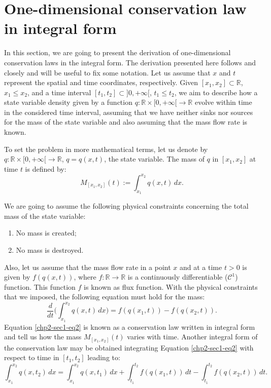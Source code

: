 \section{One-dimensional conservation law in integral form}
\label{chp2-sec1}
In this section, we are going to present the derivation of one-dimensional 
conservation laws in the integral form. 
The derivation presented here follows \citet{leveque:1990} and \citet{leveque:2002} closely and will
be useful to fix some notation. 
Let us assume that $x$ and $t$ represent the spatial and time coordinates, respectively.
Given $[x_1, x_2] \subset \mathbb{R}$, $x_1 \leq x_2$, and a time 
interval $[t_1, t_2] \subset ]0, +\infty[$, $t_1 \leq t_2$, 
we aim to describe how a state variable density given by a function
$q: \mathbb{R}\times[0, +\infty[ \to \mathbb{R}$ 
evolve within time in the considered time interval, assuming that we have neither sinks nor sources 
for the mass of the state variable and also assuming that the mass
flow rate is known.

To set the problem in more mathematical terms, let us denote by 
${q}: \mathbb{R}\times [0, +\infty[\to \mathbb{R}$, 
${q} = {q}(x,t)$, the state variable.
The mass of ${q}$ in $[x_1, x_2]$ at time $t$ is defined by:
\begin{equation}
	\label{chp2-sec1-eq1}
	{M}_{[x_1, x_2]}(t) := \int_{x_1}^{x_2} {q}(x,t) \,dx.
\end{equation}

We are going to assume the following physical constraints concerning the total mass of the state variable:
\begin{enumerate}
	\item No mass is created;
	\item No mass is destroyed.
\end{enumerate}

Also, let us assume that the mass flow rate in a point $x$ and at a time 
$t > 0$ is given by ${f}({q}(x,t))$, where ${f}:\mathbb{R} \to \mathbb{R}$ is 
a continuously differentiable ($\mathcal{C}^1$) function. This function ${f}$ is known as flux function.
With the physical constraints that we imposed, the following equation must hold for the mass:
\begin{equation}
	\label{chp2-sec1-eq2}
	\frac{d}{dt} \bigg( \int_{x_1}^{x_2} {q}(x,t) \,dx \bigg) = 
	{f}({q}(x_1,t)) - {f}({q}(x_2,t)) .
\end{equation}
Equation \eqref{chp2-sec1-eq2} is known as a conservation law written in integral form and tell us how the mass 
${M}_{[x_1, x_2]}(t)$ varies with time. Another integral form of the conservation law may be obtained integrating
Equation \eqref{chp2-sec1-eq2} with respect to time in $[t_1, t_2]$ leading to: 
\begin{equation}
	\label{chp2-sec1-eq3}
	\int_{x_1}^{x_2} {q}(x, t_2) \,dx = 
	\int_{x_1}^{x_2} {q}(x, t_1) \,dx + 
	\int_{t_1}^{t_2} {f}({q}(x_1, t)) \,dt -
	\int_{t_1}^{t_2}{f}({q}(x_2, t)) \,dt .
\end{equation}

